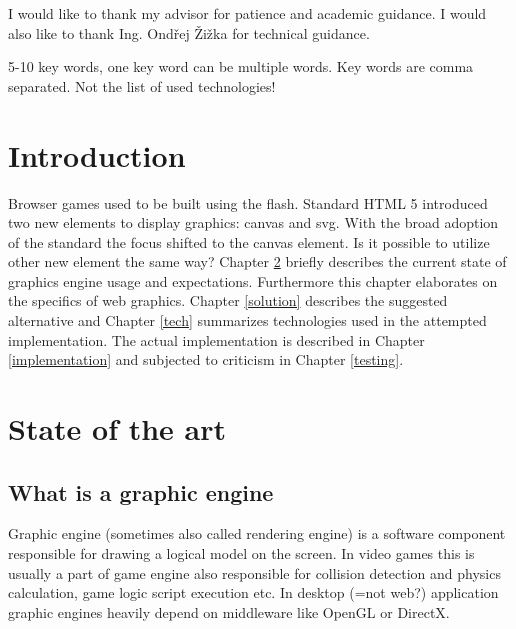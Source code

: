 \documentclass[11pt,oneside, final]{fithesis2}
\begin{document}
  
\FrontMatter  
\ThesisTitlePage  
 
\begin{ThesisDeclaration}  
\DeclarationText  
\AdvisorName  
\end{ThesisDeclaration}  
 
\begin{ThesisThanks}  
I would like to thank my advisor for patience and academic guidance. I would also like to thank Ing. Ondřej Žižka for technical guidance.
\end{ThesisThanks}  
 
\begin{ThesisAbstract}  

\end{ThesisAbstract}  
 
\begin{ThesisKeyWords}  
5-10 key words, one key word can be multiple words. Key words are comma separated. Not the list of used technologies!
\end{ThesisKeyWords}  
 
\MainMatter
 
\tableofcontents          %
 
\chapter{Introduction}
Browser games used to be built using the flash\cite{}. Standard HTML 5 introduced two new elements to display graphics: canvas and svg\cite{}. With the broad adoption of the standard the focus shifted to the canvas element\cite{}. Is it possible to utilize other new element the same way? Chapter \ref{theory} briefly describes the current state of graphics engine usage and expectations. Furthermore this chapter elaborates on the specifics of web graphics. Chapter \ref{solution} describes the suggested alternative and Chapter \ref{tech} summarizes technologies used in the attempted implementation. The actual implementation is described in Chapter \ref{implementation} and subjected to criticism in Chapter \ref{testing}.

\chapter{State of the art}
\label{theory}

\section{What is a graphic engine}
Graphic engine (sometimes also called rendering engine\cite{}) is a software component responsible for drawing a logical model on the screen. In video games this is usually a part of game engine also responsible for collision detection and physics calculation, game logic script execution etc. In desktop (=not web?) application graphic engines heavily depend on middleware like OpenGL or DirectX\cite{}. 
\end{document}
